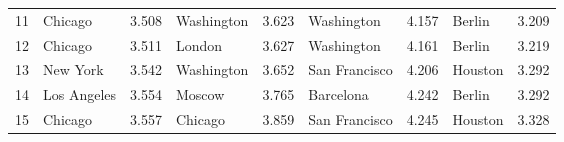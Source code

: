 \documentclass[svgnames,a4paper,final,notitlepage,10pt]{article}
\begin{document}
\begin{center}
\begin{tabular}{llrlrlrlr}
11 &      Chicago &        3.508 &     Washington &         3.623 &         Washington &          4.157 &                      Berlin &         3.209 \\
12 &     Chicago &        3.511 &         London &         3.627 &          Washington &          4.161 &                     Berlin &         3.219 \\
13 &     New York &        3.542 &     Washington &         3.652 &         San Francisco &       4.206 &                     Houston &         3.292 \\
14 &  Los Angeles &        3.554 &         Moscow &         3.765 &         Barcelona &           4.242 &                      Berlin &         3.292 \\
15 &      Chicago &        3.557 &        Chicago &         3.859 &         San Francisco &       4.245 &                     Houston &         3.328 \\
\midrule

\end{tabular}
\end{center}
\end{document}
